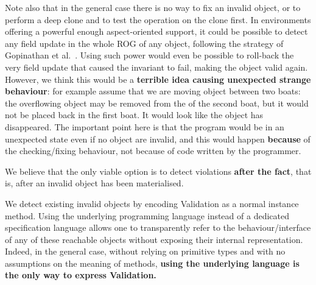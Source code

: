 Note also that in the general case there is no way to fix an invalid object,
or to perform a deep clone and to test the operation on the clone first.
In environments offering a powerful enough aspect-oriented support,
it could be possible to detect any field update in the whole ROG of
any object, following the strategy of 
Gopinathan et al.~\cite{Gopinathan:2008:RMO:1483018.1483028}.
Using such power would even be possible to roll-back the very field update that caused 
the invariant to fail, making the object valid again.
However, we think this would be a \textbf{terrible idea causing unexpected strange behaviour}: for example
assume that we are moving object between two boats:
the overflowing object may be removed from the \Q@cargo@ of the second boat, but it would not
be placed back in the first boat. It would look like the object has disappeared.
The important point here is that the program would be in an unexpected state
even if no object are invalid, and this would happen \textbf{because} of the 
checking/fixing behaviour, not because of code written by the programmer.

We believe that the only viable option is to detect violations 
\textbf{after the fact}, that is,
after an invalid object has been materialised.


We detect existing invalid objects by encoding Validation as a normal instance method.
Using the underlying programming language instead of a dedicated specification language allows one to transparently refer to the behaviour/interface of any of these reachable objects without exposing their internal representation.
Indeed, in the general case, without relying on primitive types and with no assumptions on the meaning of methods,
\textbf{using the underlying language is the only way to express Validation.}


